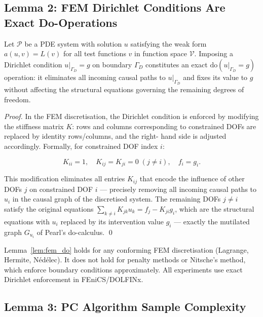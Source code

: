 \documentclass[twoside,11pt]{article}
\newcommand{\doOp}{\mathrm{do}}
\begin{document}
\subsection{Lemma 2: FEM Dirichlet Conditions Are Exact Do-Operations}

\begin{lemma}
\label{lem:fem_do}
Let $\mathcal{P}$ be a PDE system with solution $u$ satisfying the
weak form $a(u,v) = L(v)$ for all test functions $v$ in function space
$\mathcal{V}$. Imposing a Dirichlet condition $u|_{\Gamma_D} = g$
on boundary $\Gamma_D$ constitutes an exact $\doOp(u|_{\Gamma_D} = g)$
operation: it eliminates all incoming causal paths to $u|_{\Gamma_D}$
and fixes its value to $g$ without affecting the structural equations
governing the remaining degrees of freedom.
\end{lemma}

\begin{proof}
In the FEM discretisation, the Dirichlet condition is enforced by
modifying the stiffness matrix $K$: rows and columns corresponding to
constrained DOFs are replaced by identity rows/columns, and the right-
hand side is adjusted accordingly. Formally, for constrained DOF
index $i$:

\begin{equation}
  K_{ii} = 1, \quad K_{ij} = K_{ji} = 0 \; (j \neq i),
  \quad f_i = g_i.
  \label{eq:dirichlet}
\end{equation}

This modification eliminates all entries $K_{ij}$ that encode
the influence of other DOFs $j$ on constrained DOF $i$ --- precisely
removing all incoming causal paths to $u_i$ in the causal graph of
the discretised system. The remaining DOFs $j \neq i$ satisfy the
original equations $\sum_{k \neq i} K_{jk} u_k = f_j - K_{ji} g_i$,
which are the structural equations with $u_i$ replaced by its
intervention value $g_i$ --- exactly the mutilated graph
$G_{u_i}$ of Pearl's do-calculus. \qed
\end{proof}

\begin{remark}
Lemma~\ref{lem:fem_do} holds for any conforming FEM discretisation
(Lagrange, Hermite, N{\'e}d{\'e}lec). It does not hold for penalty
methods or Nitsche's method, which enforce boundary conditions
approximately. All experiments use exact Dirichlet enforcement
in FEniCS/DOLFINx.
\end{remark}

\subsection{Lemma 3: PC Algorithm Sample Complexity}
\end{document}
